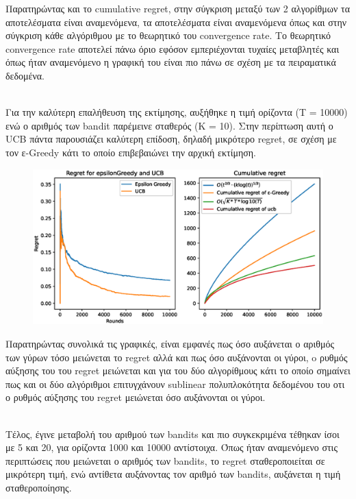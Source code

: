 \noindent
Παρατηρώντας και το cumulative regret, στην σύγκριση μεταξύ των 2 αλγορίθμων τα αποτελέσματα είναι αναμενόμενα, τα αποτελέσματα είναι αναμενόμενα όπως και στην σύγκριση κάθε αλγόριθμου με το θεωρητικό του convergence rate. Το θεωρητικό convergence rate αποτελεί πάνω όριο εφόσον εμπεριέχονται τυχαίες μεταβλητές και όπως ήταν αναμενόμενο η γραφική του είναι πιο πάνω σε σχέση με τα πειραματικά δεδομένα.

\noindent\\
Για την καλύτερη επαλήθευση της εκτίμησης, αυξήθηκε η τιμή ορίζοντα (Τ = 10000) ενώ ο αριθμός των bandit παρέμεινε σταθερός (Κ = 10). Στην περίπτωση αυτή ο UCB πάντα παρουσιάζει καλύτερη επίδοση, δηλαδή μικρότερο regret, σε σχέση με τον ε-Greedy κάτι το οποίο επιβεβαιώνει την αρχική εκτίμηση. 


\begin{figure}[h]
	\centering
	\includegraphics[width=.6\linewidth]{Images/Regret10_10000.eps} 
	\label{fig:epsilon_10000}
\end{figure}


\noindent
Παρατηρώντας συνολικά τις γραφικές, είναι εμφανές πως όσο αυξάνεται ο αριθμός των γύρων τόσο μειώνεται το regret αλλά και πως όσο αυξάνονται οι γύροι, o ρυθμός αύξησης του του regret μειώνεται και για του δύο αλγορίθμους κάτι το οποίο σημαίνει πως και οι δύο αλγόριθμοι επιτυγχάνουν sublinear πολυπλοκότητα δεδομένου του οτι ο ρυθμός αύξησης του regret μειώνεται όσο αυξάνονται οι γύροι.

\noindent\\
Τέλος, έγινε μεταβολή του αριθμού των bandits και πιο συγκεκριμένα τέθηκαν ίσοι με 5 και 20, για ορίζοντα 1000 και 10000 αντίστοιχα. Όπως ήταν αναμενόμενο στις περιπτώσεις που μειώνεται ο αριθμός των bandits, το regret σταθεροποιείται σε μικρότερη τιμή, ενώ αντίθετα αυξάνοντας τον αριθμό των bandits, αυξάνεται η τιμή σταθεροποίησης.


